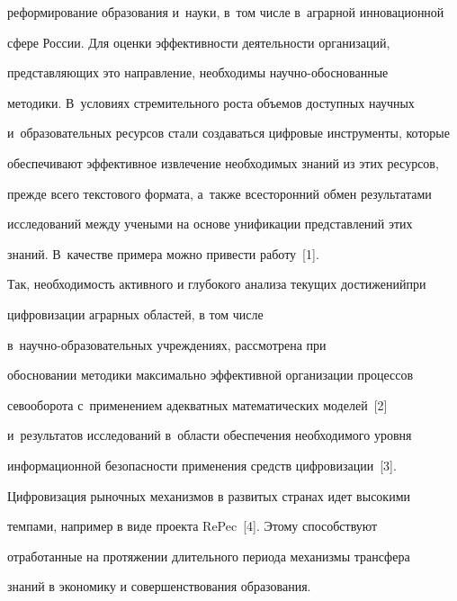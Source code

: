 реформирование образования и~науки, в~том числе в~аграрной инновационной 


сфере России. Для оценки эффективности деятельности организаций, 


пред\-став\-ля\-ющих это направление, необходимы на\-уч\-но-обосно\-ван\-ные 


методики. В~условиях стремительного роста объемов доступных научных 


и~образовательных ресурсов стали создаваться цифровые инструменты, которые 


обеспечивают эффективное извлечение необходимых знаний из этих ресурсов, 


прежде всего текстового формата, а~также всесторонний обмен результатами 


исследований между учеными на основе унификации представлений этих 


знаний. В~качестве примера можно привести работу~[1].


  


  Так, необходимость активного и глубокого анализа текущих достижений\linebreak при 


цифровизации аграрных областей, в том числе  


в~на\-уч\-но-об\-ра\-зо\-ва\-тель\-ных учреждениях, рассмотрена при 


обосновании методики максимально эффективной организации процессов 


севооборота с~применением адекватных математических моделей~[2] 


и~результатов исследований в~об\-ласти обеспечения \mbox{необходимого} уровня 


информационной безопас\-ности применения средств цифровизации~[3].


{





}


  


  Цифровизация рыночных механизмов в развитых странах идет высокими 


темпами, например в виде проекта RePec~[4]. Этому способствуют 


отработанные на протяжении длительного периода механизмы трансфера 


знаний в экономику и совершенствования образования. 


